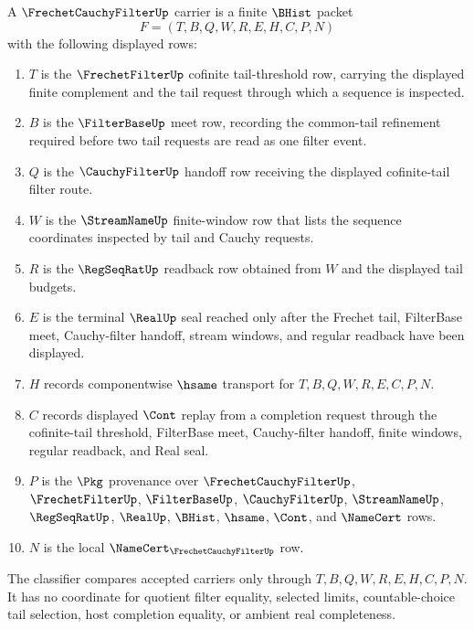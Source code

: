 \begin{definition}
\label{def:frechet-cauchy-filter-carrier}
A $\FrechetCauchyFilterUp$ carrier is a finite $\BHist$ packet
$$
F=(T,B,Q,W,R,E,H,C,P,N)
$$
with the following displayed rows:
\begin{enumerate}
\item $T$ is the $\FrechetFilterUp$ cofinite tail-threshold row, carrying the displayed finite complement and the tail request through which a sequence is inspected.
\item $B$ is the $\FilterBaseUp$ meet row, recording the common-tail refinement required before two tail requests are read as one filter event.
\item $Q$ is the $\CauchyFilterUp$ handoff row receiving the displayed cofinite-tail filter route.
\item $W$ is the $\StreamNameUp$ finite-window row that lists the sequence coordinates inspected by tail and Cauchy requests.
\item $R$ is the $\RegSeqRatUp$ readback row obtained from $W$ and the displayed tail budgets.
\item $E$ is the terminal $\RealUp$ seal reached only after the Frechet tail, FilterBase meet, Cauchy-filter handoff, stream windows, and regular readback have been displayed.
\item $H$ records componentwise $\hsame$ transport for $T,B,Q,W,R,E,C,P,N$.
\item $C$ records displayed $\Cont$ replay from a completion request through the cofinite-tail threshold, FilterBase meet, Cauchy-filter handoff, finite windows, regular readback, and Real seal.
\item $P$ is the $\Pkg$ provenance over $\FrechetCauchyFilterUp$, $\FrechetFilterUp$, $\FilterBaseUp$, $\CauchyFilterUp$, $\StreamNameUp$, $\RegSeqRatUp$, $\RealUp$, $\BHist$, $\hsame$, $\Cont$, and $\NameCert$ rows.
\item $N$ is the local $\NameCert_{\FrechetCauchyFilterUp}$ row.
\end{enumerate}
The classifier compares accepted carriers only through $T,B,Q,W,R,E,H,C,P,N$. It has no coordinate for quotient filter equality, selected limits, countable-choice tail selection, host completion equality, or ambient real completeness.
\end{definition}

